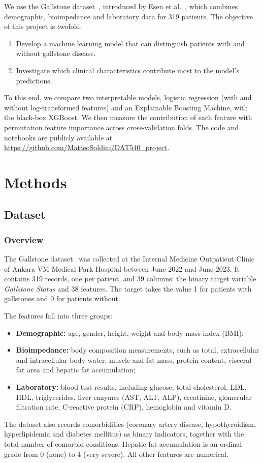 \documentclass[conference]{IEEEtran}
\begin{document}
We use the Gallstone dataset~\cite{gallstone_1150}, introduced by Esen et
al.~\cite{esen2024gallstone}, which combines demographic, bioimpedance and
laboratory data for 319 patients. The objective of this project is twofold:
\begin{enumerate}
\item Develop a machine learning model that can distinguish patients with and
  without gallstone disease.
\item Investigate which clinical characteristics contribute most to the
  model's predictions.
\end{enumerate}
To this end, we compare two interpretable models, logistic regression (with
and without log-transformed features) and an Explainable Boosting Machine,
with the black-box XGBoost. We then measure the contribution of each feature
with permutation feature importance across cross-validation folds. The code
and notebooks are publicly available at
\url{https://github.com/MatteoSoldini/DAT540_project}.

\section{Methods}
\label{sec:methods}

\subsection{Dataset}
\label{ssec:dataset}

\subsubsection{Overview}
\label{ssec:overview}

The Gallstone dataset~\cite{gallstone_1150} was collected at the Internal
Medicine Outpatient Clinic of Ankara VM Medical Park Hospital between June 2022
and June 2023. It contains 319 records, one per patient, and 39 columns: the binary target
variable \emph{Gallstone Status} and 38 features. The target takes the value 1 for patients with gallstones and 0 for patients
without.

The features fall into three groups:
\begin{itemize}
\item \textbf{Demographic:} age, gender, height, weight and body mass index (BMI);
\item \textbf{Bioimpedance:} body composition measurements, such as total,
  extracellular and intracellular body water, muscle and fat mass, protein
  content, visceral fat area and hepatic fat accumulation;
\item \textbf{Laboratory:} blood test results, including glucose, total
  cholesterol, LDL, HDL, triglycerides, liver enzymes (AST, ALT, ALP),
  creatinine, glomerular filtration rate, C-reactive protein (CRP), hemoglobin
  and vitamin D.
\end{itemize}
The dataset also records comorbidities (coronary artery disease,
hypothyroidism, hyperlipidemia and diabetes mellitus) as binary indicators,
together with the total number of comorbid conditions. Hepatic fat
accumulation is an ordinal grade from 0 (none) to 4 (very severe). All other
features are numerical.
\end{document}
